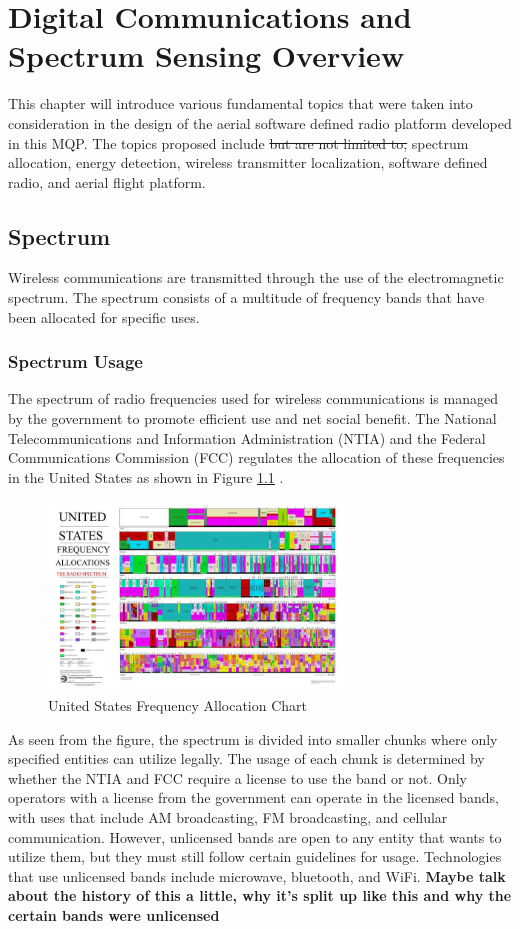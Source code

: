 \chapter{Digital Communications and Spectrum Sensing Overview}
This chapter will introduce various fundamental topics that were taken into consideration in the design of the aerial software defined radio platform developed in this MQP. The topics proposed include \sout{but are not limited to,} spectrum allocation, energy detection, wireless transmitter localization, software defined radio, and aerial flight platform.

\section{Spectrum}
Wireless communications are transmitted through the use of the electromagnetic spectrum. The spectrum consists of a multitude of frequency bands that have been allocated for specific uses.

\subsection{Spectrum Usage}
The spectrum of radio frequencies used for wireless communications is managed by the government to promote efficient use and net social benefit. The National Telecommunications and Information Administration (NTIA) and the Federal Communications Commission (FCC) regulates the allocation of these frequencies in the United States as shown in Figure \ref{fig:freq_chart} \cite{FCC_Info}. 
\begin{figure}[ht]
\centering
\includegraphics[width=0.70\textwidth]{img/the_radio_spectrum.jpg}
\caption{United States Frequency Allocation Chart \cite{FCC_Info}}
\label{fig:freq_chart}
\end{figure}
As seen from the figure, the spectrum is divided into smaller chunks where only specified entities can utilize legally. The usage of each chunk is determined by whether the NTIA and FCC require a license to use the band or not. Only operators with a license from the government can operate in the licensed bands, with uses that include AM broadcasting, FM broadcasting, and cellular communication. However, unlicensed bands are open to any entity that wants to utilize them, but they must still follow certain guidelines for usage. Technologies that use unlicensed bands include microwave, bluetooth, and WiFi. \textbf{Maybe talk about the history of this a little, why it's split up like this and why the certain bands were unlicensed}

